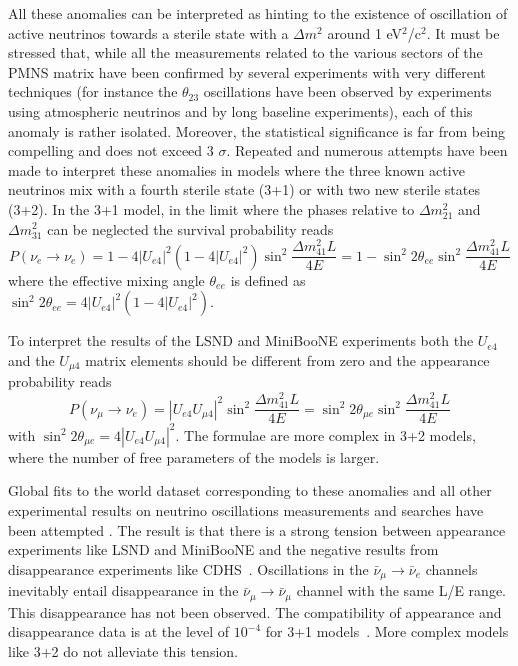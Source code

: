 All these anomalies can be interpreted as hinting to the existence of oscillation of active neutrinos towards a sterile state with a $\Delta m^2$ around 1 eV$^2$/c$^2$. 
It must be stressed that, while all the measurements related to the various sectors of the PMNS matrix have been confirmed by several experiments with very different techniques (for instance the $ \theta_{23}$ oscillations have been observed by experiments using atmospheric neutrinos and by long baseline experiments), each of this anomaly is rather isolated. Moreover, the statistical significance is far from being compelling and does not exceed 3 $\sigma$. 
Repeated and numerous attempts have been made to interpret these anomalies in models where the three known active neutrinos mix with a fourth sterile state (3+1) or with two new sterile states (3+2).
 In the 3+1 model, in the limit where the phases relative to $\Delta m^2_{21}$ and $\Delta m^2_{31}$ can be neglected  the survival probability reads
\begin{equation}
P(\nu_e \rightarrow \nu_e) = 1 - 4 |U_{e4}|^2 (1 - 4 |U_{e4}|^2) \sin^2 \frac{\Delta m^2_{41}L}{4E} = 1 - \sin^2 2\theta_{ee} \sin^2 \frac{\Delta m^2_{41}L}{4E}
\end{equation}
where the effective mixing angle $\theta_{ee}$ is defined as $\sin^2 2 \theta_{ee} = 4 |U_{e4}|^2 (1 - 4 |U_{e4}|^2)$. 

To interpret the results of the LSND and MiniBooNE experiments both the $U_{e4}$ and the $U_{\mu 4}$ matrix elements should be different from zero and the appearance probability reads
\begin{equation}
P(\nu_\mu \rightarrow \nu_e) = |U_{e4} U_{\mu 4}|^2  \sin^2 \frac{\Delta m^2_{41}L}{4E} = \sin^2 2 \theta_{\mu e} \sin^2 \frac{\Delta m^2_{41}L}{4E}
\end{equation}
with $\sin^2 2 \theta_{\mu e} = 4 |U_{e4} U_{\mu 4}|^2$.
The formulae are more complex in 3+2 models, where the number of free parameters of the models is larger.

Global fits to the world dataset corresponding to these anomalies and all other experimental results on neutrino oscillations measurements and searches have been attempted \cite{giuntirev,kopp}. The result is that there is a strong tension between appearance experiments like LSND and MiniBooNE and the negative results from disappearance experiments like CDHS~\cite{dydak}. Oscillations in the $\bar{\nu}_\mu \rightarrow  \bar{\nu}_e$ channels inevitably entail disappearance in the 
$\bar{\nu}_\mu \rightarrow  \bar{\nu}_\mu$ channel with the same L/E range. This disappearance has not been observed. The compatibility of appearance and disappearance data is at the level of $10^{-4}$ for 3+1 models~\cite{kopp}. More complex models like 3+2 do not alleviate this tension. 

